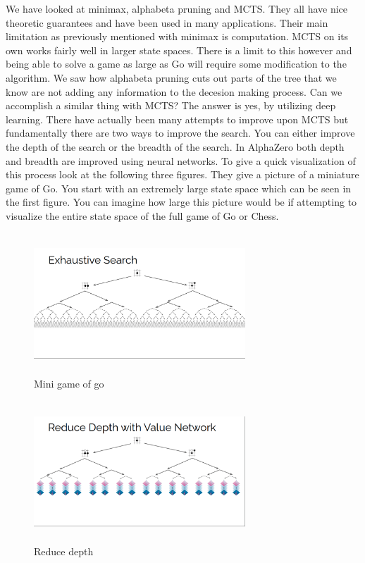    
   We have looked at minimax, alphabeta pruning and MCTS. They all have nice theoretic guarantees and have been used in many applications. Their main limitation as previously mentioned with minimax is computation. MCTS on its own works fairly well in larger state spaces. There is a limit to this however and being able to solve a game as large as Go will require some modification to the algorithm. We saw how alphabeta pruning cuts out parts of the tree that we know are not adding any information to the decesion making process. Can we accomplish a similar thing with MCTS? The answer is yes, by utilizing deep learning. There have actually been many attempts to improve upon MCTS but fundamentally there are two ways to improve the search. You can either improve the depth of the search or the breadth of the search. In AlphaZero both depth and breadth are improved using neural networks. To give a quick visualization of this process look at the following three figures. They give a picture of a miniature game of Go. You start with an extremely large state space which can be seen in the first figure. You can imagine how large this picture would be if attempting to visualize the entire state space of the full game of Go or Chess. 
   
   \begin{figure}[h!]
       \centering
       \includegraphics[width=300px,height=200px]{images/julian_exhaustive_search.png}
       \caption{Mini game of go}
       \label{fig:my_label}
   \end{figure}

    \begin{figure}[h!]
       \centering
       \includegraphics[width=300px,height=200px]{images/julian_reduce_value_network.png}
       \caption{Reduce depth}
       \label{fig:my_label}
   \end{figure}

